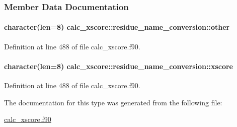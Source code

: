 \subsubsection{Member Data Documentation}
\hypertarget{structcalc__xscore_1_1residue__name__conversion_a1a3dba91e23f89e2e1ba190da3f7375a}{
\paragraph[{other}]{\setlength{\rightskip}{0pt plus 5cm}character(len=8) calc\-\_\-xscore\-::residue\-\_\-name\-\_\-conversion\-::other}}\label{structcalc__xscore_1_1residue__name__conversion_a1a3dba91e23f89e2e1ba190da3f7375a}


Definition at line 488 of file calc\-\_\-xscore.\-f90.

\hypertarget{structcalc__xscore_1_1residue__name__conversion_a8dc992df9772213fb3de3b69b79a93f9}{
\paragraph[{xscore}]{\setlength{\rightskip}{0pt plus 5cm}character(len=8) calc\-\_\-xscore\-::residue\-\_\-name\-\_\-conversion\-::xscore}}\label{structcalc__xscore_1_1residue__name__conversion_a8dc992df9772213fb3de3b69b79a93f9}


Definition at line 488 of file calc\-\_\-xscore.\-f90.



The documentation for this type was generated from the following file\-:\begin{DoxyCompactItemize}
\item 
\hyperlink{calc__xscore_8f90}{calc\-\_\-xscore.\-f90}\end{DoxyCompactItemize}
